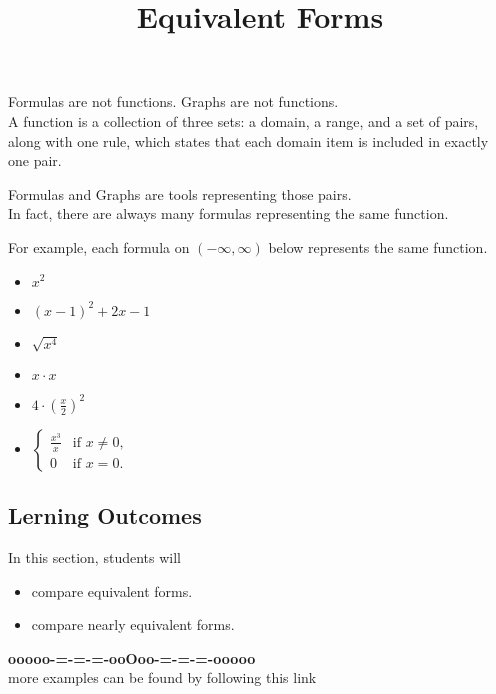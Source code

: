 \documentclass{ximera}
\title{Equivalent Forms}
\begin{document}
\begin{abstract}
\end{abstract}
\maketitle




Formulas are not functions.  Graphs are not functions. \\


A function is a collection of three sets: a domain, a range, and a set of pairs, along with one rule, which states that each domain item is included in exactly one pair.

Formulas and Graphs are tools representing those pairs.  \\


In fact, there are always many formulas representing the same function.

For example, each formula on $(-\infty, \infty)$ below represents the same function.


\begin{itemize}
\item $x^2$
\item $(x - 1)^2 + 2 x - 1$
\item $\sqrt{x^4}$
\item $ x \cdot x$
\item $ 4 \cdot \left( \frac{x}{2} \right)^2$
\item $\begin{cases}
  \frac{x^3}{x} &\text{if $x \ne 0$,}\\
  0 &\text{if $x = 0$}.
\end{cases}$
\end{itemize}









\subsection*{Lerning Outcomes}


\begin{sectionOutcomes}
In this section, students will 

\begin{itemize}
\item compare equivalent forms.
\item compare nearly equivalent forms.
\end{itemize}
\end{sectionOutcomes}










\begin{center}
\textbf{\textcolor{green!50!black}{ooooo-=-=-=-ooOoo-=-=-=-ooooo}} \\

more examples can be found by following this link\\ 

\end{center}
\end{document}
